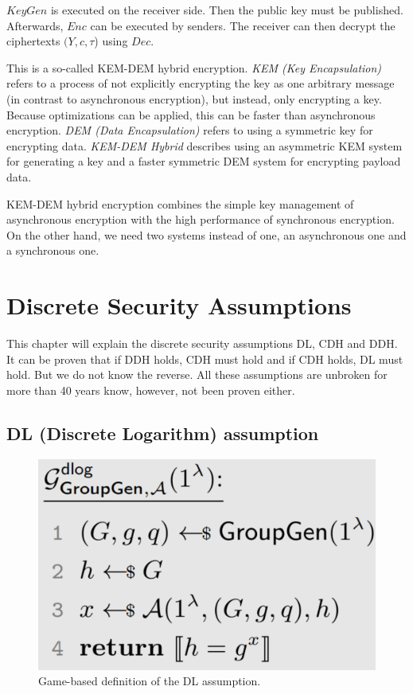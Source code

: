 $KeyGen$ is executed on the receiver side.
Then the public key must be published.
Afterwards, $Enc$ can be executed by senders.
The receiver can then decrypt the ciphertexts $(Y, c, \tau$) using $Dec$.

This is a so-called KEM-DEM hybrid encryption.
\textit{KEM (Key Encapsulation)} refers to a process of not explicitly encrypting the key as one arbitrary message (in contrast to asynchronous encryption), but instead, only encrypting a key. Because optimizations can be applied, this can be faster than asynchronous encryption.
\textit{DEM (Data Encapsulation)} refers to using a symmetric key for encrypting data.
\textit{KEM-DEM Hybrid} describes using an asymmetric KEM system for generating a key and a faster symmetric DEM system for encrypting payload data.

KEM-DEM hybrid encryption combines the simple key management of asynchronous encryption with the high performance of synchronous encryption.
On the other hand, we need two systems instead of one, an asynchronous one and a synchronous one.

\section{Discrete Security Assumptions}

This chapter will explain the discrete security assumptions DL, CDH and DDH.
It can be proven that if DDH holds, CDH must hold and if CDH holds, DL must hold.
But we do not know the reverse.
All these assumptions are unbroken for more than 40 years know, however, not been proven either.

\subsection{DL (Discrete Logarithm) assumption}

\begin{figure}
    \center
    \includegraphics[width=\linewidth]{gfx/discrete_log_assumption.png}
    \caption{Game-based definition of the DL assumption.}
    \label{fig:DL_assumption}
\end{figure}

